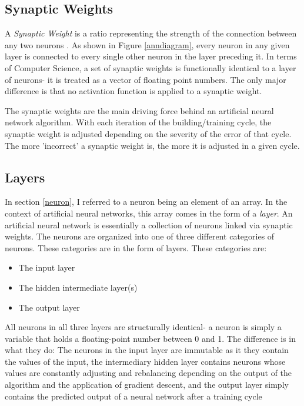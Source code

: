 \documentclass[12pt]{article}
\begin{document}
\subsection{Synaptic Weights \label{weights}}

A \textit{Synaptic Weight} is a ratio representing the strength of the connection between any two neurons \textcite{shamdasani2017}. As shown in Figure \ref{anndiagram}, every neuron in any given layer is connected to every single other neuron in the layer preceding it. In terms of Computer Science, a set of synaptic weights is functionally identical to a layer of neurons- it is treated as a vector of floating point numbers. The only major difference is that no activation function is applied to a synaptic weight.

The synaptic weights are the main driving force behind an artificial neural network algorithm. With each iteration of the building/training cycle, the synaptic weight is adjusted depending on the severity of the error of that cycle. The more 'incorrect' a synaptic weight is, the more it is adjusted in a given cycle.

\subsection{Layers}

In section \ref{neuron}, I referred to a neuron being an element of an array. In the context of artificial neural networks, this array comes in the form of a \textit{layer}. An artificial neural network is essentially a collection of neurons linked via synaptic weights. The neurons are organized into one of three different categories of neurons. These categories are in the form of layers. These categories are:

\begin{itemize}
  \item The input layer
  \item The hidden intermediate layer(s)
  \item The output layer
\end{itemize}

All neurons in all three layers are structurally identical- a neuron is simply a variable that holds a floating-point number between 0 and 1. The difference is in what they do: The neurons in the input layer are immutable as it they contain the values of the input, the intermediary hidden layer contains neurons whose values are constantly adjusting and rebalancing depending on the output of the algorithm and the application of gradient descent, and the output layer simply contains the predicted output of a neural network after a training cycle
\end{document}
